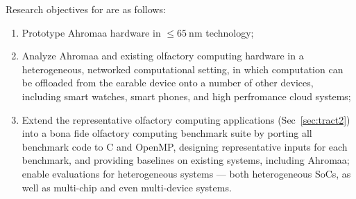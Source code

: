 Research objectives for \lfc{} are as follows:

\begin{enumerate}
\item Prototype Ahromaa hardware in \(\leq \SI{65}{\nano\meter}\) technology;
\item Analyze Ahromaa and existing olfactory computing hardware in a heterogeneous, networked
     computational setting, in which computation can be offloaded from the earable
     device onto a number of other devices, including smart watches, smart phones,
     and high perfromance cloud systems;
\item Extend the representative olfactory computing applications (Sec~\ref{sec:tract2})
    into a bona fide olfactory computing benchmark suite by
    porting all benchmark code to C and OpenMP, designing representative inputs
    for each benchmark, and providing baselines on existing systems, including
    Ahromaa; enable evaluations for heterogeneous systems --- both
    heterogeneous SoCs, as well as multi-chip and even multi-device systems.
\end{enumerate}

